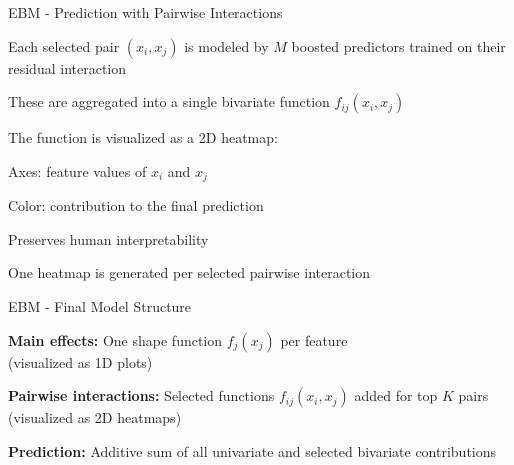 \documentclass[10pt,compress,t,notes=noshow, xcolor=table]{beamer}
\begin{document}
\begin{framev}[align=top]{EBM - Prediction with Pairwise Interactions}
\begin{itemizeM}
\item Each selected pair $(x_i, x_j)$ is modeled by $M$ boosted predictors trained on their residual interaction
\item These are aggregated into a single bivariate function $f_{ij}(x_i, x_j)$
\item The function is visualized as a 2D heatmap:
\begin{itemizeS}
\item Axes: feature values of $x_i$ and $x_j$
\item Color: contribution to the final prediction
\item Preserves human interpretability
\end{itemizeS}
\item One heatmap is generated per selected pairwise interaction
\end{itemizeM}
\spacer[0.25]
\end{framev}


\begin{framev}[align=top]{EBM - Final Model Structure}
\begin{itemizeM}
\item \textbf{Main effects:} One shape function $f_j(x_j)$ per feature\\
(visualized as 1D plots)
\item \textbf{Pairwise interactions:} Selected functions $f_{ij}(x_i, x_j)$ added for top $K$ pairs (visualized as 2D heatmaps)
\item \textbf{Prediction:} Additive sum of all univariate and selected bivariate contributions
\end{itemizeM}
\spacer[0.25]
\end{framev}
\end{document}
